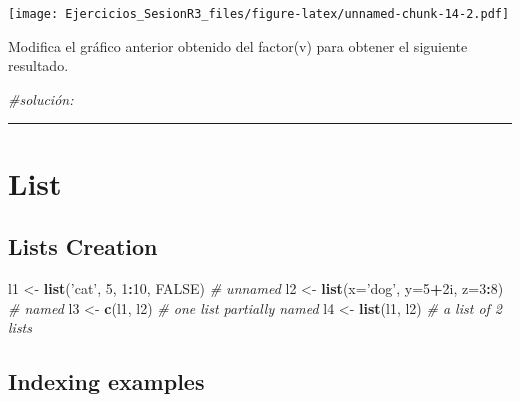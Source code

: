 \documentclass[
]{article}
\newenvironment{Shaded}{\begin{snugshade}}{\end{snugshade}}
\newcommand{\CommentTok}[1]{\textcolor[rgb]{0.56,0.35,0.01}{\textit{#1}}}
\newcommand{\DataTypeTok}[1]{\textcolor[rgb]{0.13,0.29,0.53}{#1}}
\newcommand{\DecValTok}[1]{\textcolor[rgb]{0.00,0.00,0.81}{#1}}
\newcommand{\KeywordTok}[1]{\textcolor[rgb]{0.13,0.29,0.53}{\textbf{#1}}}
\newcommand{\NormalTok}[1]{#1}
\newcommand{\OperatorTok}[1]{\textcolor[rgb]{0.81,0.36,0.00}{\textbf{#1}}}
\newcommand{\OtherTok}[1]{\textcolor[rgb]{0.56,0.35,0.01}{#1}}
\newcommand{\StringTok}[1]{\textcolor[rgb]{0.31,0.60,0.02}{#1}}
\begin{document}
\texttt{[image: Ejercicios\_SesionR3\_files/figure-latex/unnamed-chunk-14-2.pdf]}

Modifica el gráfico anterior obtenido del factor(v) para obtener el
siguiente resultado.

\begin{Shaded}
\begin{Highlighting}[]
\CommentTok{#solución: }
\end{Highlighting}
\end{Shaded}

\begin{center}\rule{0.5\linewidth}{0.5pt}\end{center}

\hypertarget{list}{%
\section{List}\label{list}}

\hypertarget{lists-creation}{%
\subsection{Lists Creation}\label{lists-creation}}

\begin{Shaded}
\begin{Highlighting}[]
\NormalTok{l1 <-}\StringTok{ }\KeywordTok{list}\NormalTok{(}\StringTok{'cat'}\NormalTok{, }\DecValTok{5}\NormalTok{, }\DecValTok{1}\OperatorTok{:}\DecValTok{10}\NormalTok{, }\OtherTok{FALSE}\NormalTok{) }\CommentTok{# unnamed }
\NormalTok{l2 <-}\StringTok{ }\KeywordTok{list}\NormalTok{(}\DataTypeTok{x=}\StringTok{'dog'}\NormalTok{, }\DataTypeTok{y=}\DecValTok{5}\OperatorTok{+}\NormalTok{2i, }\DataTypeTok{z=}\DecValTok{3}\OperatorTok{:}\DecValTok{8}\NormalTok{) }\CommentTok{# named }
\NormalTok{l3 <-}\StringTok{ }\KeywordTok{c}\NormalTok{(l1, l2) }\CommentTok{# one list partially named }
\NormalTok{l4 <-}\StringTok{ }\KeywordTok{list}\NormalTok{(l1, l2) }\CommentTok{# a list of 2 lists}
\end{Highlighting}
\end{Shaded}

\hypertarget{indexing-examples}{%
\subsection{Indexing examples}\label{indexing-examples}}
\end{document}
